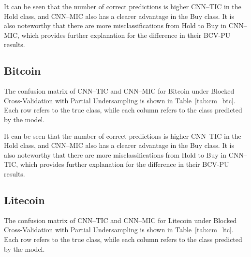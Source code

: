 It can be seen that the number of correct predictions is higher CNN--TIC in the Hold class, and CNN--MIC also has a clearer advantage in the Buy class. It is also noteworthy that there are more misclassifications from Hold to Buy in CNN--MIC, which provides further explanation for the difference in their BCV-PU results.

\subsection{Bitcoin}

The confusion matrix of CNN--TIC and CNN--MIC for Bitcoin under Blocked Cross-Validation with Partial Undersampling is shown in Table~\ref{tab:cm_btc}. Each row refers to the true class, while each column refers to the class predicted by the model.

\begin{center}
	\centering
	\scriptsize
	\label{tab:cm_btc}
	\renewcommand{\arraystretch}{1.2}
\end{center}

It can be seen that the number of correct predictions is higher CNN--TIC in the Hold class, and CNN--MIC also has a clearer advantage in the Buy class. It is also noteworthy that there are more misclassifications from Hold to Buy in CNN--TIC, which provides further explanation for the difference in their BCV-PU results.

\subsection{Litecoin}

The confusion matrix of CNN--TIC and CNN--MIC for Litecoin under Blocked Cross-Validation with Partial Undersampling is shown in Table~\ref{tab:cm_ltc}. Each row refers to the true class, while each column refers to the class predicted by the model.

